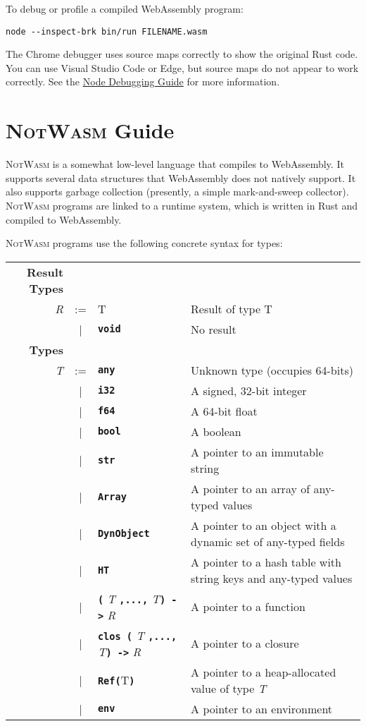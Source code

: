 \documentclass{book}
\newcommand{\notwasm}{\textsc{NotWasm}\xspace}
\newcommand{\kw}[1]{\textbf{\texttt{#1}}}
\newcommand{\metavar}[1]{\textit{#1}}
\begin{document}
To debug or profile a compiled WebAssembly program:

\begin{verbatim}
node --inspect-brk bin/run FILENAME.wasm
\end{verbatim}

The Chrome debugger uses source maps correctly to show the original Rust code.
You can use Visual Studio Code or Edge, but source maps do not appear to work
correctly. See the
\href{https://nodejs.org/en/docs/guides/debugging-getting-started/}{Node
Debugging Guide} for more information.

\chapter{\notwasm Guide}

\notwasm is a somewhat low-level language that compiles to WebAssembly. It
supports several data structures that WebAssembly does not natively support. It
also supports garbage collection (presently, a simple mark-and-sweep collector).
\notwasm programs are linked to a runtime system, which is written in Rust
and compiled to WebAssembly.

\notwasm programs use the following concrete syntax for types:

\begin{tabular}{rcll}
\textbf{Result Types} \\
\metavar{R} & := & T 
            & \textrm{Result of type T} \\
            & |  & \kw{void}
            & \textrm{No result} \\
\textbf{Types} \\
\metavar{T} & := & \kw{any} 
         & Unknown type (occupies 64-bits) \\
    & |  & \kw{i32} 
         & A signed, 32-bit integer \\
    & |  & \kw{f64} 
         & A 64-bit float \\
    & |  & \kw{bool} 
         & A boolean \\
    & |  & \kw{str} 
         & A pointer to an immutable string \\
    & |  & \kw{Array}
         & A pointer to an array of any-typed values \\
    & |  & \kw{DynObject} 
         & A pointer to an object with a dynamic set of any-typed fields \\
    & |  & \kw{HT}
         & A pointer to a hash table with string keys and any-typed values \\
    & |  & \kw{(} \metavar{T} \kw{,...,} \metavar{T}\kw{) ->} \metavar{R}
         & A pointer to a function \\
    & |  & \kw{clos (} \metavar{T} \kw{,...,} \metavar{T}\kw{) ->} \metavar{R}
         & A pointer to a closure \\
    & |  & \kw{Ref(}T\kw{)}
         & A pointer to a heap-allocated value of type \metavar{T} \\
    & |  & \kw{env}
         & A pointer to an environment \\
\end{tabular}
\end{document}
